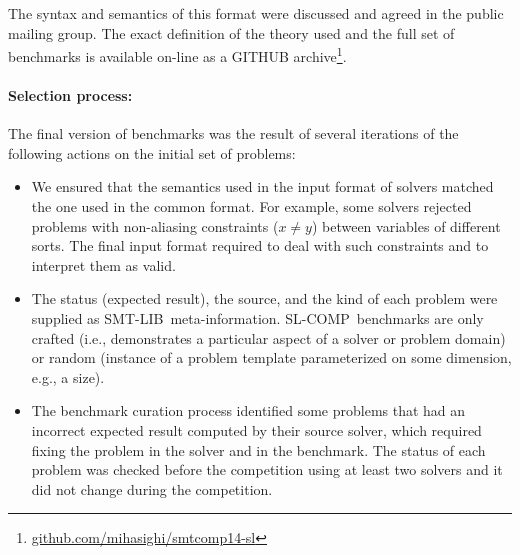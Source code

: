 \documentclass[twoside,11pt]{article}
\newcommand{\smtlib}{\textsf{SMT-LIB}}
\newcommand{\slcomp}{\textsf{SL-COMP}}
\begin{document}
The syntax and semantics of this format were discussed and agreed in the public mailing group. 
The exact definition of the theory used and the full set of benchmarks is available on-line as a GITHUB archive\footnote{\url{github.com/mihasighi/smtcomp14-sl}}.

\paragraph{Selection process:} The final version of benchmarks was the result of several iterations of the following actions on the initial set of problems:
\begin{itemize}
\item We ensured that the semantics used in the input format of solvers matched the one used in the common format. 
For example, some solvers rejected problems with non-aliasing constraints ($x\neq y$) between variables of different sorts. The final input format required to deal with such constraints and to interpret them as valid.

\item The status (expected result), the source, and the kind of each problem were supplied as \smtlib\ meta-information.
\slcomp\ benchmarks are only crafted (i.e., demonstrates a particular aspect of a solver or problem domain) or
random (instance of a problem template parameterized on some dimension, e.g., a size).

\item The benchmark curation process identified some problems that had an incorrect expected result computed by their source solver, which required fixing the problem in the solver and in the benchmark.
The status of each problem was checked before the competition using at least two solvers and it did not change during the competition. 
\end{itemize}
\end{document}

